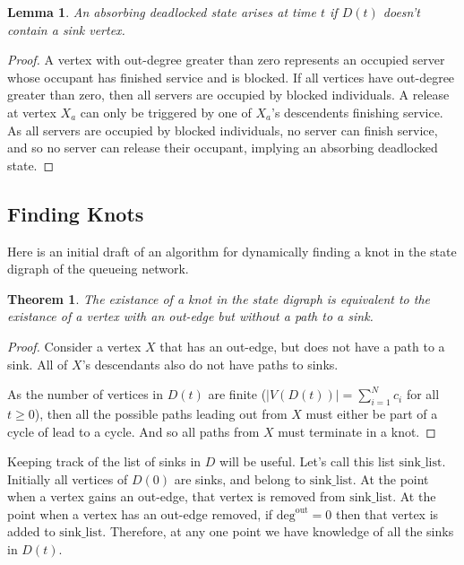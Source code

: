 \documentclass{article}
\newtheorem{theorem}{Theorem}
\newtheorem{lemma}{Lemma}
\begin{document}
\begin{lemma}
An absorbing deadlocked state arises at time $t$ if $D(t)$ doesn't contain a sink vertex.
\end{lemma}

\begin{proof}
A vertex with out-degree greater than zero represents an occupied server whose occupant has finished service and is blocked.
If all vertices have out-degree greater than zero, then all servers are occupied by blocked individuals.
A release at vertex $X_a$ can only be triggered by one of $X_a$'s descendents finishing service.
As all servers are occupied by blocked individuals, no server can finish service, and so no server can release their occupant, implying an absorbing deadlocked state.
\end{proof}

\subsection{Finding Knots}
Here is an initial draft of an algorithm for dynamically finding a knot in the state digraph of the queueing network.

\begin{theorem}
    The existance of a knot in the state digraph is equivalent to the existance of a vertex with an out-edge but without a path to a sink.
\end{theorem}

\begin{proof}
    Consider a vertex $X$ that has an out-edge, but does not have a path to a sink.
    All of $X$'s descendants also do not have paths to sinks.

    As the number of vertices in $D(t)$ are finite ($\left| V\left(D\left(t\right)\right) \right| = \sum_{i=1}^N c_i$ for all $t \geq 0$), then all the possible paths leading out from $X$ must either be part of a cycle of lead to a cycle.
    And so all paths from $X$ must terminate in a knot.
\end{proof}

Keeping track of the list of sinks in $D$ will be useful.
Let's call this list $\text{sink\_list}$.
Initially all vertices of $D(0)$ are sinks, and belong to $\text{sink\_list}$.
At the point when a vertex gains an out-edge, that vertex is removed from $\text{sink\_list}$.
At the point when a vertex has an out-edge removed, if $\text{deg}^{\text{out}} = 0$ then that vertex is added to $\text{sink\_list}$.
Therefore, at any one point we have knowledge of all the sinks in $D(t)$.
\end{document}
